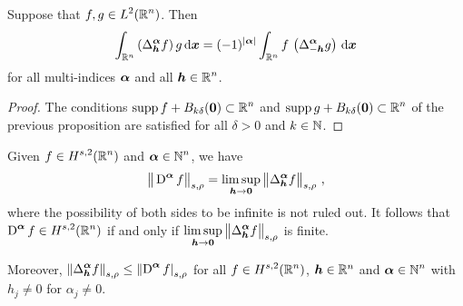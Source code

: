 \begin{cor}
Suppose that $\displaystyle f,g \in L^2(\mathbb{R}^n)$.  Then
\[
\int_{\mathbb{R}^n} \left(\Delta^{{\bm{\alpha}}}_{{\bm{h}}} f\right) g \,\mathrm{d}{{\bm{x}}}
= (-1)^{|{\bm{\alpha}}|}
\int_{\mathbb{R}^n} f\,\left(\Delta^{{\bm{\alpha}}}_{-{\bm{h}}} g\right) \,\mathrm{d}{{\bm{x}}}
\]
for all multi-indices ${\bm{\alpha}}$ and all $\displaystyle {\bm{h}} \in \mathbb{R}^n$.
\end{cor}

\begin{proof}
The conditions $\displaystyle \operatorname{supp} f + B_{k\delta}({\bm{0}}) \subset \mathbb{R}^n$ and
$\displaystyle \operatorname{supp} g + B_{k\delta}({\bm{0}}) \subset \mathbb{R}^n$ of the previous
proposition are satisfied for all $\delta>0$ and $k \in \mathbb{N}$.
\end{proof}

\begin{prop} \label{ell_reg_prop3}
Given $\displaystyle f\in H^{s,2}(\mathbb{R}^n)$ and
$\displaystyle {\bm{\alpha}} \in \mathbb{N}^n$, we have
\begin{equation} \label{ellRegProp3Eq1}
\big\|\operatorname{D}^{{\bm{\alpha}}} f\big\|_{s,\rho} = \limsup_{{\bm{h}}\rightarrow {\bm{0}}}
\big\|\Delta^{{\bm{\alpha}}}_{{\bm{h}}} f\big\|_{s,\rho} \ ,
\end{equation}
where the possibility of both sides to be infinite is not ruled out.
It follows that $\displaystyle \operatorname{D}^{{\bm{\alpha}}} f \in H^{s,2}(\mathbb{R}^n)$
if and only if $\displaystyle \limsup_{{\bm{h}}\rightarrow {\bm{0}}}
\big\|\Delta^{{\bm{\alpha}}}_{{\bm{h}}} f\big\|_{s,\rho}$ is finite.

Moreover,
$\displaystyle \left\| \Delta^{{\bm{\alpha}}}_{{\bm{h}}} f  \right\|_{s,\rho}
\leq \left\| \operatorname{D}^{{\bm{\alpha}}} f\right|_{s,\rho}$ for all
$\displaystyle f\in H^{s,2}(\mathbb{R}^n)$, ${\bm{h}} \in \mathbb{R}^n$ and
$\displaystyle {\bm{\alpha}} \in \mathbb{N}^n$ with $h_j \neq 0$ for $\alpha_j \neq 0$.
\end{prop}

